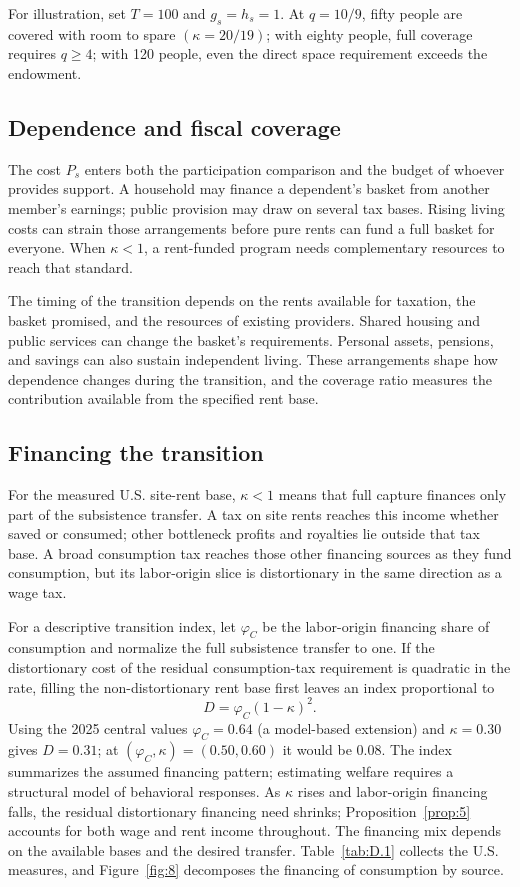 \documentclass[12pt]{article}
\theoremstyle{plain}
\begin{document}
For illustration, set $T=100$ and $g_s=h_s=1$. At $q=10/9$, fifty people are covered with room to spare $(\kappa=20/19)$; with eighty people, full coverage requires $q\ge4$; with 120 people, even the direct space requirement exceeds the endowment.

\subsection{Dependence and fiscal coverage}\label{app:D.4}

The cost $P_s$ enters both the participation comparison and the budget of whoever provides support. A household may finance a dependent's basket from another member's earnings; public provision may draw on several tax bases. Rising living costs can strain those arrangements before pure rents can fund a full basket for everyone. When $\kappa<1$, a rent-funded program needs complementary resources to reach that standard.

The timing of the transition depends on the rents available for taxation, the basket promised, and the resources of existing providers. Shared housing and public services can change the basket's requirements. Personal assets, pensions, and savings can also sustain independent living. These arrangements shape how dependence changes during the transition, and the coverage ratio measures the contribution available from the specified rent base.

\subsection{Financing the transition}\label{app:D.5}

For the measured U.S. site-rent base, $\kappa<1$ means that full capture finances only part of the subsistence transfer. A tax on site rents reaches this income whether saved or consumed; other bottleneck profits and royalties lie outside that tax base. A broad consumption tax reaches those other financing sources as they fund consumption, but its labor-origin slice is distortionary in the same direction as a wage tax.

For a descriptive transition index, let $\varphi_C$ be the labor-origin financing share of consumption and normalize the full subsistence transfer to one. If the distortionary cost of the residual consumption-tax requirement is quadratic in the rate, filling the non-distortionary rent base first leaves an index proportional to
\[
D=\varphi_C(1-\kappa)^2.
\]
Using the 2025 central values $\varphi_C=0.64$ (a model-based extension) and $\kappa=0.30$ gives $D=0.31$; at $(\varphi_C,\kappa)=(0.50,0.60)$ it would be 0.08. The index summarizes the assumed financing pattern; estimating welfare requires a structural model of behavioral responses. As $\kappa$ rises and labor-origin financing falls, the residual distortionary financing need shrinks; Proposition~\ref{prop:5} accounts for both wage and rent income throughout. The financing mix depends on the available bases and the desired transfer. Table~\ref{tab:D.1} collects the U.S. measures, and Figure~\ref{fig:8} decomposes the financing of consumption by source.
\end{document}
